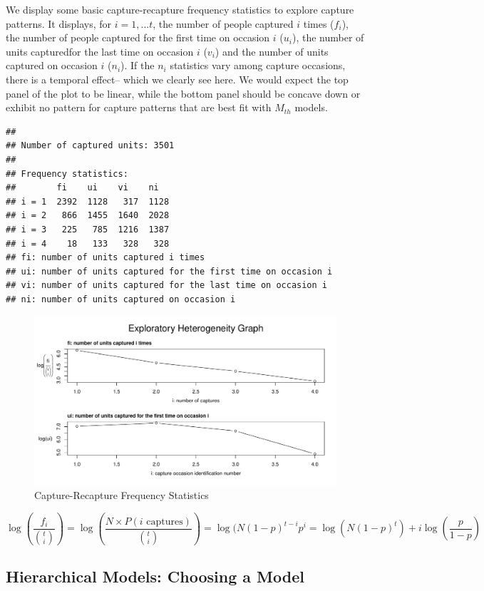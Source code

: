 \documentclass[]{article}
\begin{document}
We display some basic capture-recapture frequency statistics to explore
capture patterns. It displays, for \(i= 1,...t\), the number of people
captured \(i\) times (\(f_i\)), the number of people captured for the
first time on occasion \(i\) (\(u_i\)), the number of units capturedfor
the last time on occasion \(i\) (\(v_i\)) and the number of units
captured on occasion \(i\) (\(n_i\)). If the \(n_i\) statistics vary
among capture occasions, there is a temporal effect-- which we clearly
see here. We would expect the top panel of the plot to be linear, while
the bottom panel should be concave down or exhibit no pattern for
capture patterns that are best fit with \(M_{th}\) models.

\begin{verbatim}
## 
## Number of captured units: 3501 
##  
## Frequency statistics:
##        fi    ui    vi    ni  
## i = 1  2392  1128   317  1128
## i = 2   866  1455  1640  2028
## i = 3   225   785  1216  1387
## i = 4    18   133   328   328
## fi: number of units captured i times
## ui: number of units captured for the first time on occasion i
## vi: number of units captured for the last time on occasion i
## ni: number of units captured on occasion i
\end{verbatim}

\begin{figure}
\centering
\includegraphics{Categorical-FinalProject_files/figure-latex/descriptive-stats-1.pdf}
\caption{Capture-Recapture Frequency Statistics}
\end{figure}

\[\log\left(\frac{f_i}{{t \choose i}}\right) = \log \left(\frac{N \times P(i \text{ captures})}{{t \choose i}}\right) = \log(N(1-p)^{t-i} p^i = \log(N(1-p)^t) + i\log\left(\frac{p}{1-p}\right)\]

\hypertarget{hierarchical-models-choosing-a-model}{%
\subsection{Hierarchical Models: Choosing a
Model}\label{hierarchical-models-choosing-a-model}}
\end{document}
